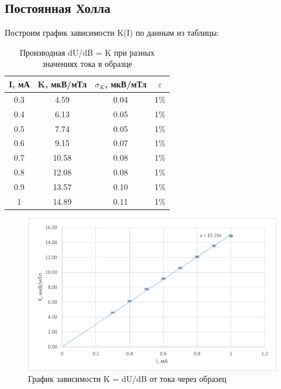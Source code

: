 \subsection{Постоянная Холла}

Построим график зависимости K(I) по данным из таблицы:

\begin{table}[H]
\centering
\caption{Производная dU/dB = K при разных значениях тока в образце}
\label{t3}
\begin{tabular}{|c|c|c|c|}
\hline
\rowcolor[HTML]{A9D08E} 
I, мА & K, мкВ/мТл & $\sigma_K$,   мкВ/мТл & $\varepsilon$ \\ \hline
0.3  & 4.59       & 0.04                  & 1\%           \\ \hline
0.4  & 6.13       & 0.05                  & 1\%           \\ \hline
0.5  & 7.74       & 0.05                  & 1\%           \\ \hline
0.6  & 9.15       & 0.07                  & 1\%           \\ \hline
0.7  & 10.58      & 0.08                  & 1\%           \\ \hline
0.8  & 12.08      & 0.08                  & 1\%           \\ \hline
0.9  & 13.57      & 0.10                  & 1\%           \\ \hline
1    & 14.89      & 0.11                  & 1\%           \\ \hline
\end{tabular}
\end{table}

\begin{figure}[H]
    \centering
    \includegraphics[width=1\textwidth]{pictures/K.png}
    \caption{График зависимости K = dU/dB от тока через образец}
\end{figure} 

